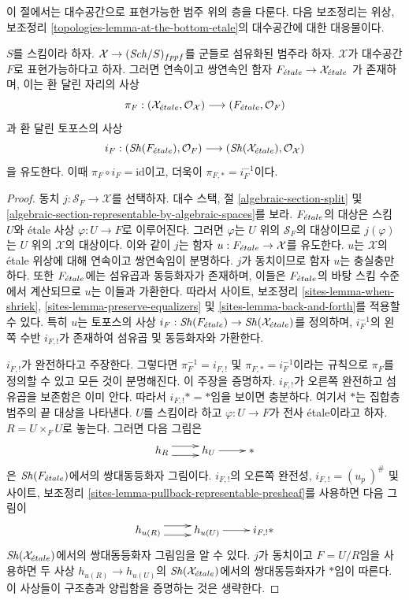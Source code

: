 \noindent
이 절에서는 대수공간으로 표현가능한 범주 위의 층을 다룬다.
다음 보조정리는 위상, 보조정리
\ref{topologies-lemma-at-the-bottom-etale}의 대수공간에 대한
대응물이다.

\begin{lemma}
\label{lemma-compare}
$S$를 스킴이라 하자. $\mathcal{X} \to (\mathit{Sch}/S)_{fppf}$를 군들로
섬유화된 범주라 하자. $\mathcal{X}$가 대수공간 $F$로
표현가능하다고 하자. 그러면 연속이고 쌍연속인 함자
$
F_{\acute{e}tale} \to \mathcal{X}_{\acute{e}tale}
$
가 존재하며, 이는 환 달린 자리의 사상
$$
\pi_F :
(\mathcal{X}_{\acute{e}tale}, \mathcal{O}_\mathcal{X})
\longrightarrow
(F_{\acute{e}tale}, \mathcal{O}_F)
$$
과 환 달린 토포스의 사상
$$
i_F :
(\mathop{\mathit{Sh}}\nolimits(F_{\acute{e}tale}), \mathcal{O}_F)
\longrightarrow
(\mathop{\mathit{Sh}}\nolimits(\mathcal{X}_{\acute{e}tale}), \mathcal{O}_\mathcal{X})
$$
을 유도한다. 이때 $\pi_F \circ i_F = \text{id}$이고,
더욱이 $\pi_{F, *} = i_F^{-1}$이다.
\end{lemma}

\begin{proof}
동치 $j : \mathcal{S}_F \to \mathcal{X}$를 선택하자. 대수 스택, 절
\ref{algebraic-section-split} 및
\ref{algebraic-section-representable-by-algebraic-spaces}를 보라.
$F_{\acute{e}tale}$의 대상은 스킴 $U$와 \'etale 사상
$\varphi : U \to F$로 이루어진다. 그러면 $\varphi$는 $U$ 위의
$\mathcal{S}_F$의 대상이므로 $j(\varphi)$는 $U$ 위의
$\mathcal{X}$의 대상이다. 이와 같이 $j$는 함자
$u : F_{\acute{e}tale} \to \mathcal{X}$를 유도한다. $u$는
$\mathcal{X}$의 \'etale 위상에 대해 연속이고 쌍연속임이 분명하다.
$j$가 동치이므로 함자 $u$는 충실충만하다. 또한 $F_{\acute{e}tale}$에는
섬유곱과 동등화자가 존재하며, 이들은 $F_{\acute{e}tale}$의 바탕 스킴
수준에서 계산되므로 $u$는 이들과 가환한다. 따라서 사이트,
보조정리 \ref{sites-lemma-when-shriek},
\ref{sites-lemma-preserve-equalizers} 및
\ref{sites-lemma-back-and-forth}를 적용할 수 있다. 특히 $u$는
토포스의 사상 $i_F : \mathop{\mathit{Sh}}\nolimits(F_{\acute{e}tale}) \to \mathop{\mathit{Sh}}\nolimits(\mathcal{X}_{\acute{e}tale})$를
정의하며, $i_F^{-1}$의 왼쪽 수반 $i_{F, !}$가 존재하여 섬유곱 및
동등화자와 가환한다.

\medskip\noindent
$i_{F, !}$가 완전하다고 주장한다. 그렇다면
$\pi_F^{-1} = i_{F, !}$ 및 $\pi_{F, *} = i_F^{-1}$이라는 규칙으로
$\pi_F$를 정의할 수 있고 모든 것이 분명해진다. 이 주장을 증명하자.
$i_{F, !}$가 오른쪽 완전하고 섬유곱을 보존함은 이미 안다.
따라서 $i_{F, !}* = *$임을 보이면 충분하다. 여기서 $*$는 집합층
범주의 끝 대상을 나타낸다. $U$를 스킴이라 하고
$\varphi : U \to F$가 전사 \'etale이라고 하자.
$R = U \times_F U$로 놓는다. 그러면
다음 그림은
$$
\xymatrix{
h_R \ar@<1ex>[r] \ar@<-1ex>[r] & h_U \ar[r] & {*}
}
$$
은 $\mathop{\mathit{Sh}}\nolimits(F_{\acute{e}tale})$에서의 쌍대동등화자 그림이다.
$i_{F, !}$의 오른쪽 완전성, $i_{F, !} = (u_p\ )^\#$ 및 사이트,
보조정리 \ref{sites-lemma-pullback-representable-presheaf}를
사용하면 다음 그림이
$$
\xymatrix{
h_{u(R)} \ar@<1ex>[r] \ar@<-1ex>[r] & h_{u(U)} \ar[r] & i_{F, !}{*}
}
$$
$\mathop{\mathit{Sh}}\nolimits(\mathcal{X}_{\acute{e}tale})$에서의 쌍대동등화자 그림임을 알 수 있다.
$j$가 동치이고 $F = U/R$임을 사용하면 두 사상
$h_{u(R)} \to h_{u(U)}$의 $\mathop{\mathit{Sh}}\nolimits(\mathcal{X}_{\acute{e}tale})$에서의
쌍대동등화자가 $*$임이 따른다. 이 사상들이 구조층과 양립함을
증명하는 것은 생략한다.
\end{proof}

